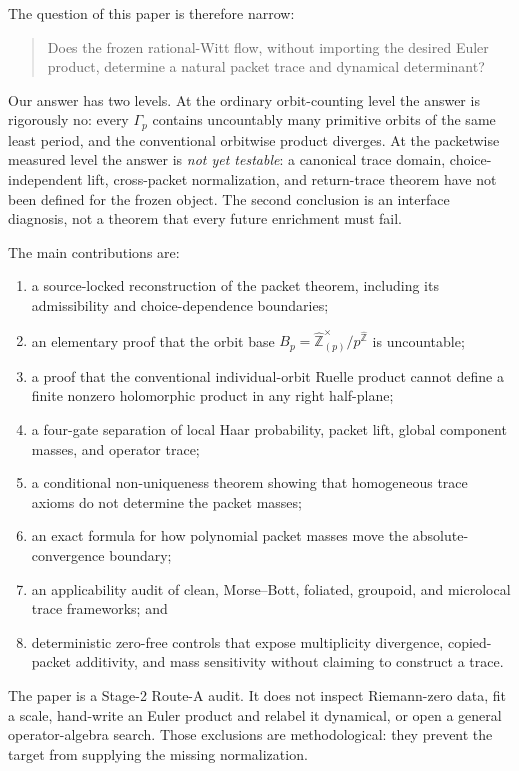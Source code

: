 \documentclass[11pt]{article}
\theoremstyle{definition}
\theoremstyle{remark}
\newcommand{\Z}{\mathbb{Z}}
\begin{document}
The question of this paper is therefore narrow:

\begin{quote}
Does the frozen rational-Witt flow, without importing the desired Euler
product, determine a natural packet trace and dynamical determinant?
\end{quote}

Our answer has two levels.  At the ordinary orbit-counting level the answer is
rigorously no: every \(\Gamma_p\) contains uncountably many primitive orbits of
the same least period, and the conventional orbitwise product diverges.  At
the packetwise measured level the answer is \emph{not yet testable}: a
canonical trace domain, choice-independent lift, cross-packet normalization,
and return-trace theorem have not been defined for the frozen object.  The
second conclusion is an interface diagnosis, not a theorem that every future
enrichment must fail.

The main contributions are:
\begin{enumerate}[leftmargin=*,itemsep=2pt]
  \item a source-locked reconstruction of the packet theorem, including its
  admissibility and choice-dependence boundaries;
  \item an elementary proof that the orbit base
  \(B_p=\widehat{\Z}_{(p)}^\times/p^{\widehat{\Z}}\) is uncountable;
  \item a proof that the conventional individual-orbit Ruelle product cannot
  define a finite nonzero holomorphic product in any right half-plane;
  \item a four-gate separation of local Haar probability, packet lift,
  global component masses, and operator trace;
  \item a conditional non-uniqueness theorem showing that homogeneous trace
  axioms do not determine the packet masses;
  \item an exact formula for how polynomial packet masses move the
  absolute-convergence boundary;
  \item an applicability audit of clean, Morse--Bott, foliated, groupoid, and
  microlocal trace frameworks; and
  \item deterministic zero-free controls that expose multiplicity divergence,
  copied-packet additivity, and mass sensitivity without claiming to construct
  a trace.
\end{enumerate}

The paper is a Stage-2 Route-A audit.  It does not inspect Riemann-zero data,
fit a scale, hand-write an Euler product and relabel it dynamical, or open a
general operator-algebra search.  Those exclusions are methodological: they
prevent the target from supplying the missing normalization.
\end{document}
